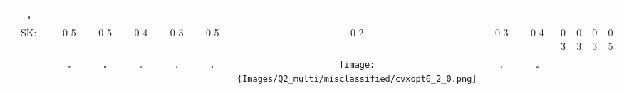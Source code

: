 \documentclass[12pt]{article}
\begin{document}
\begin{enumerate}[label=(\alph*)]
\begin{center}
\begin{tabular}{c c c c c c c c c c c c c}
            \includegraphics[width=0.065\textwidth]{Images/Q2_multi/misclassified/sklearn12_5_0.png} \\
            SK: &
            {\color{red} 0} {\color{green} 5} &
            {\color{red} 0} {\color{green} 5} &
            {\color{red} 0} {\color{green} 4} &
            {\color{red} 0} {\color{green} 3} &
            {\color{red} 0} {\color{green} 5} &
            {\color{red} 0} {\color{green} 2} &
            {\color{red} 0} {\color{green} 3} &
            {\color{red} 0} {\color{green} 4} &
            {\color{red} 0} {\color{green} 3} &
            {\color{red} 0} {\color{green} 3} &
            {\color{red} 0} {\color{green} 3} &
            {\color{red} 0} {\color{green} 5} \\
            &
            \includegraphics[width=0.065\textwidth]{Images/Q2_multi/misclassified/cvxopt1_5_0.png} &
            \includegraphics[width=0.065\textwidth]{Images/Q2_multi/misclassified/cvxopt2_5_0.png} &
            \includegraphics[width=0.065\textwidth]{Images/Q2_multi/misclassified/cvxopt3_4_0.png} &
            \includegraphics[width=0.065\textwidth]{Images/Q2_multi/misclassified/cvxopt4_3_0.png} &
            \includegraphics[width=0.065\textwidth]{Images/Q2_multi/misclassified/cvxopt5_5_0.png} &
            \texttt{[image: \{Images/Q2\_multi/misclassified/cvxopt6\_2\_0.png]}} &
            \includegraphics[width=0.065\textwidth]{Images/Q2_multi/misclassified/cvxopt7_3_0.png} &
            \includegraphics[width=0.065\textwidth]{Images/Q2_multi/misclassified/cvxopt8_4_0.png} &

\end{tabular}
\end{center}
\end{enumerate}
\end{document}
